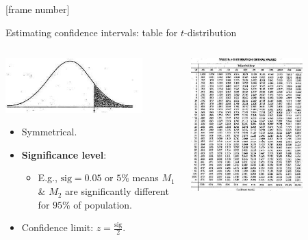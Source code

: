 \documentclass[aspectratio=169,t,table]{beamer}
\begin{document}
  {
    [frame number]
    \begin{frame}{Estimating confidence intervals: table for $t$-distribution}
      \begin{columns}
        \begin{column}{0.5\textwidth}
          \vspace{-6cm}

          \centering
          \includegraphics[width=0.8\textwidth]{img/ttest1.jpeg}
          \begin{itemize}
            \item Symmetrical.
            \item \textbf{\color{airforceblue}Significance level}:
            \begin{itemize}
              \item E.g., $\text{sig} = 0.05$ or $5\%$ means $M_1$ \& $M_2$ are significantly different for $95\%$ of population.
            \end{itemize}
            \item Confidence limit: $z = \frac{\text{sig}}{2}$.
          \end{itemize}
        \end{column}
        \begin{column}{0.5\textwidth}
          \centering
          \includegraphics[width=0.7\textwidth]{img/ttest2.jpeg}
        \end{column}
      \end{columns}
    \end{frame}
  }
\end{document}
